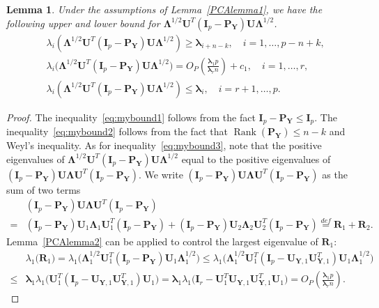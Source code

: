 \documentclass[12pt]{article} %
\DeclareMathOperator{\myrank}{Rank}
\newcommand{\bP}{\mathbf{P}}
\newcommand{\bY}{\mathbf{Y}}
\newcommand{\bR}{\mathbf{R}}
\newcommand{\bI}{\mathbf{I}}
\newcommand{\bU}{\mathbf{U}}
\newcommand{\bfsym}[1]{\ensuremath{\boldsymbol{#1}}}
\def\blambda {\bfsym {\lambda}}
\def\bLambda {\bfsym {\Lambda}}
\newtheorem{lemma}{Lemma}
\theoremstyle{definition}
\begin{document}
\begin{appendices}
\begin{lemma}\label{gg:Lemma1}
    Under the assumptions of Lemma~\ref{PCAlemma1},
    we have the following upper and lower bound for $\bLambda^{1/2}\bU^T (\bI_p-\bP_{\bY})\bU\bLambda^{1/2}$.
    \begin{align}
        &\lambda_i (\bLambda^{1/2}\bU^T (\bI_p-\bP_{\bY})\bU\bLambda^{1/2})\geq
        \blambda_{i+n-k},\quad 
        \text{$i=1,\ldots, p-n+k$},
        \label{eq:mybound2}\\
        &\lambda_i\big(\bLambda^{1/2}\bU^T (\bI_p-\bP_{\bY})\bU\bLambda^{1/2}\big)= O_P(\frac{\blambda_1 p}{\blambda_r n}) + c_1,\quad
        \text{$i=1,\ldots, r$},\label{eq:mybound3}\\
        &\lambda_i (\bLambda^{1/2}\bU^T (\bI_p-\bP_{\bY})\bU\bLambda^{1/2})\leq
        \blambda_i, \quad 
        \text{$i=r+1,\ldots, p$}.\label{eq:mybound1}
    \end{align}
\end{lemma}
\begin{proof}
    The inequality~\eqref{eq:mybound1} follows from the fact $\bI_p-\bP_{\bY}\leq \bI_p$.
    The inequality~\eqref{eq:mybound2} follows from the fact that $\myrank(\bP_{\bY})\leq n-k$ and Weyl's inequality.
    As for inequality~\eqref{eq:mybound3}, note that the positive eigenvalues of $\bLambda^{1/2}\bU^T (\bI_p-\bP_{\bY})\bU\bLambda^{1/2}$  equal to the positive eigenvalues of $(\bI_p-\bP_{\bY})\bU\bLambda \bU^T (\bI_p-\bP_{\bY})$.
We write $(\bI_p-\bP_{\bY})\bU\bLambda \bU^T (\bI_p-\bP_{\bY})$ as the sum of two terms
$$
\begin{aligned}
&(\bI_p-\bP_{\bY})\bU\bLambda \bU^T (\bI_p-\bP_{\bY})
\\
=&
(\bI_p-\bP_{\bY})\bU_1\bLambda_1 \bU_1^T(\bI_p-\bP_{\bY})+(\bI_p-\bP_{\bY})\bU_2\bLambda_2 \bU_2^T (\bI_p-\bP_{\bY})
\overset{def}{=}\bR_1+\bR_2.
\end{aligned}
$$
Lemma~\ref{PCAlemma2} can be applied to control the largest eigenvalue of $\bR_1$:
$$
\begin{aligned}
&\lambda_{1}\big( \bR_1 \big)
=
\lambda_{1}\big(\bLambda_1^{1/2} \bU_1^T(\bI_p-\bP_{\bY}) \bU_1 \bLambda_1^{1/2}\big)
\leq 
\lambda_{1}\big(\bLambda_1^{1/2} \bU_1^T(\bI_p-\bU_{\bY,1}\bU_{\bY,1}^T) \bU_1 \bLambda_1^{1/2}\big)\\
\leq &
\blambda_1
\lambda_{1}\big(\bU_1^T(\bI_p-\bU_{\bY,1}\bU_{\bY,1}^T) \bU_1 \big)
= 
\blambda_1
\lambda_{1}\big(\bI_r - \bU_1^T\bU_{\bY,1}\bU_{\bY,1}^T \bU_1 \big)
=
O_P(\frac{\blambda_1 p}{\blambda_r n}).
\end{aligned}
$$
\end{proof}
\end{appendices}
\end{document}
